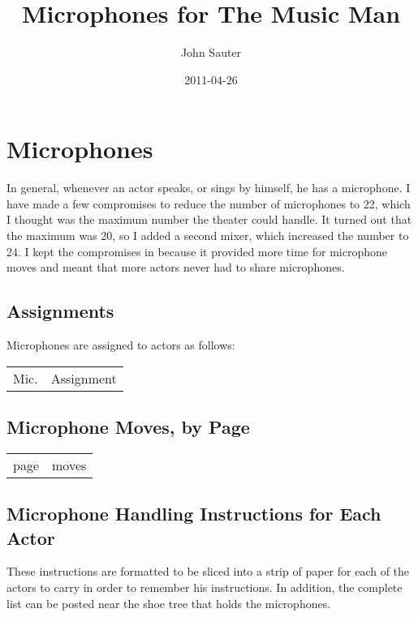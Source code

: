 \documentclass[letterpaper]{article}
\title{Microphones for The Music Man}
\author{John Sauter}
\date{2011-04-26}
\begin{document}
\maketitle
\tableofcontents
\newpage

\section {Microphones}
In general, whenever an actor speaks, or sings by himself, he has a microphone.
I have made a few compromises to reduce the number of microphones to 22,
which I thought was the maximum number the theater could handle.
It turned out that the maximum was 20, so I added a second mixer, which
increased the number to 24.  I kept the compromises in because it
provided more time for microphone moves and meant that more actors
never had to share microphones.

\subsection {Assignments}
Microphones are assigned to actors as follows:

\begin{center}
\begin{longtable}{|l|m{7in}|}
\hline Mic. & Assignment \endhead \hline

\end{longtable}
\end{center}

\subsection {Microphone Moves, by Page}

\begin{center}
\begin{longtable}{|l|m{7in}|}
\hline page & moves \endhead \hline

\end{longtable}
\end{center}

\subsection {Microphone Handling Instructions for Each Actor}

These instructions are formatted to be sliced into a strip of paper
for each of the actors to carry in order to remember his instructions.
In addition, the complete list can be posted near the shoe tree that
holds the microphones.
\end{document}
